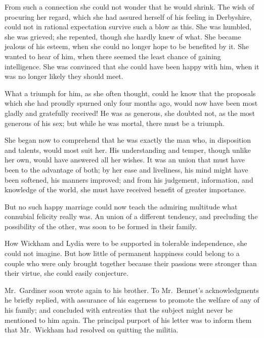 \documentclass[12pt,english,oneside]{book}
\begin{document}
From such a connection she could not wonder that he would shrink.
The wish of procuring her regard, which she had assured herself of
his feeling in Derbyshire, could not in rational expectation survive
such a blow as this. She was humbled, she was grieved; she repented,
though she hardly knew of what. She became jealous of his esteem,
when she could no longer hope to be benefited by it. She wanted to
hear of him, when there seemed the least chance of gaining intelligence.
She was convinced that she could have been happy with him, when it
was no longer likely they should meet.

What a triumph for him, as she often thought, could he know that the
proposals which she had proudly spurned only four months ago, would
now have been most gladly and gratefully received! He was as generous,
she doubted not, as the most generous of his sex; but while he was
mortal, there must be a triumph.

She began now to comprehend that he was exactly the man who, in disposition
and talents, would most suit her. His understanding and temper, though
unlike her own, would have answered all her wishes. It was an union
that must have been to the advantage of both; by her ease and liveliness,
his mind might have been softened, his manners improved; and from
his judgement, information, and knowledge of the world, she must have
received benefit of greater importance.

But no such happy marriage could now teach the admiring multitude
what connubial felicity really was. An union of a different tendency,
and precluding the possibility of the other, was soon to be formed
in their family.

How Wickham and Lydia were to be supported in tolerable independence,
she could not imagine. But how little of permanent happiness could
belong to a couple who were only brought together because their passions
were stronger than their virtue, she could easily conjecture.

\bigskip{} Mr.\ Gardiner soon wrote again to his brother. To Mr.\ Bennet's
acknowledgments he briefly replied, with assurance of his eagerness
to promote the welfare of any of his family; and concluded with entreaties
that the subject might never be mentioned to him again. The principal
purport of his letter was to inform them that Mr.\ Wickham had resolved
on quitting the militia.
\end{document}
